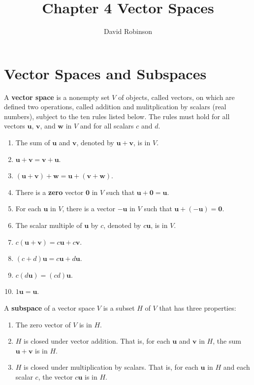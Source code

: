\documentclass{article}
\title{Chapter 4 Vector Spaces}
\author{David Robinson}
\date{}
\begin{document}
\maketitle

\section*{Vector Spaces and Subspaces}
A \textbf{vector space} is a nonempty set $V$ of objects, called vectors, on which are defined two
operations, called addition and mulitplication by scalars (real numbers), subject to the ten rules
listed below. The rules must hold for all vectors $\mathbf{u}$, $\mathbf{v}$, and $\mathbf{w}$ in
$V$ and for all scalars $c$ and $d$.

\begin{enumerate}
    \item The sum of $\mathbf{u}$ and $\mathbf{v}$, denoted by $\mathbf{u}+\mathbf{v}$, is in $V$.
    \item $\mathbf{u}+\mathbf{v}=\mathbf{v}+\mathbf{u}$.
    \item $(\mathbf{u}+\mathbf{v})+\mathbf{w}=\mathbf{u}+(\mathbf{v}+\mathbf{w})$.
    \item There is a \textbf{zero} vector $\mathbf{0}$ in $V$ such that
    $\mathbf{u}+\mathbf{0}=\mathbf{u}$.
    \item For each $\mathbf{u}$ in $V$, there is a vector $-\mathbf{u}$ in $V$ such that
    $\mathbf{u}+(-\mathbf{u})=\mathbf{0}$.
    \item The scalar multiple of $\mathbf{u}$ by $c$, denoted by $c\mathbf{u}$, is in $V$.
    \item $c(\mathbf{u}+\mathbf{v})=c\mathbf{u}+c\mathbf{v}$.
    \item $(c+d)\mathbf{u}=c\mathbf{u}+d\mathbf{u}$.
    \item $c(d\mathbf{u})=(cd)\mathbf{u}$.
    \item $1\mathbf{u}=\mathbf{u}$.
\end{enumerate}

A \textbf{subspace} of a vector space $V$ is a subset $H$ of $V$ that has three properties:
\begin{enumerate}
    \item The zero vector of $V$ is in $H$.
    \item $H$ is closed under vector addition. That is, for each $\mathbf{u}$ and $\mathbf{v}$ in
    $H$, the sum $\mathbf{u}+\mathbf{v}$ is in $H$.
    \item $H$ is closed under multiplication by scalars. That is, for each $\mathbf{u}$ in $H$ and
    each scalar $c$, the vector $c\mathbf{u}$ is in $H$.
\end{enumerate}
\end{document}
